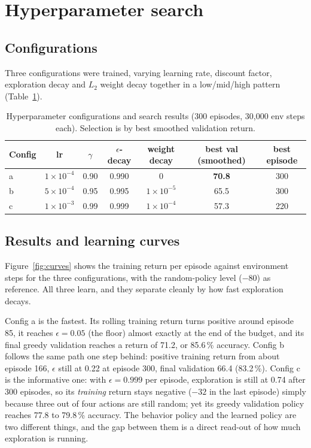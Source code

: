 \documentclass[11pt,a4paper]{article}
\begin{document}
\section{Hyperparameter search}

\subsection{Configurations}

Three configurations were trained, varying learning rate, discount factor, exploration decay and $L_2$ weight decay together in a low/mid/high pattern (Table~\ref{tab:hparam}).

\begin{table}[h]
\centering
\caption{Hyperparameter configurations and search results (300 episodes, 30{,}000 env steps each). Selection is by best smoothed validation return.}
\label{tab:hparam}
\begin{tabular}{lcccccc}
\toprule
Config & lr & $\gamma$ & $\epsilon$-decay & weight decay & best val (smoothed) & best episode \\
\midrule
a & $1{\times}10^{-4}$ & 0.90 & 0.990 & 0        & \textbf{70.8} & 300 \\
b & $5{\times}10^{-4}$ & 0.95 & 0.995 & $1{\times}10^{-5}$ & 65.5 & 300 \\
c & $1{\times}10^{-3}$ & 0.99 & 0.999 & $1{\times}10^{-4}$ & 57.3 & 220 \\
\bottomrule
\end{tabular}
\end{table}

\subsection{Results and learning curves}

Figure~\ref{fig:curves} shows the training return per episode against environment steps for the three configurations, with the random-policy level ($-80$) as reference. All three learn, and they separate cleanly by how fast exploration decays.

Config a is the fastest. Its rolling training return turns positive around episode 85, it reaches $\epsilon = 0.05$ (the floor) almost exactly at the end of the budget, and its final greedy validation reaches a return of 71.2, or 85.6\,\% accuracy. Config b follows the same path one step behind: positive training return from about episode 166, $\epsilon$ still at 0.22 at episode 300, final validation 66.4 (83.2\,\%). Config c is the informative one: with $\epsilon = 0.999$ per episode, exploration is still at 0.74 after 300 episodes, so its \emph{training} return stays negative ($-32$ in the last episode) simply because three out of four actions are still random; yet its greedy validation policy reaches 77.8 to 79.8\,\% accuracy. The behavior policy and the learned policy are two different things, and the gap between them is a direct read-out of how much exploration is running.
\end{document}
